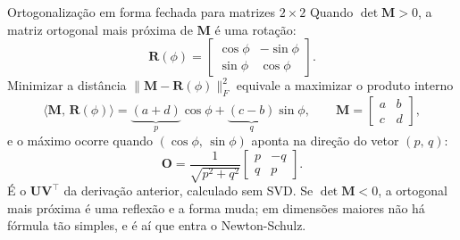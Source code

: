 \documentclass[aspectratio=169,xcolor=dvipsnames]{beamer}
\begin{document}
  \begin{frame}{Ortogonalização em forma fechada para matrizes $2\times 2$}
    Quando $\det \mathbf{M}>0$, a matriz ortogonal mais próxima de $\mathbf{M}$ é uma \alert{rotação}:
    \[
      \mathbf{R}(\phi)=\begin{bmatrix}\cos\phi&-\sin\phi\\ \sin\phi&\cos\phi\end{bmatrix}.
    \]
    Minimizar a distância $\|\mathbf{M}-\mathbf{R}(\phi)\|_{F}^{2}$ equivale a maximizar o produto interno
    \[
      \langle \mathbf{M},\,\mathbf{R}(\phi)\rangle
      =\underbrace{(a+d)}_{p}\cos\phi+\underbrace{(c-b)}_{q}\sin\phi,
      \qquad \mathbf{M}=\begin{bmatrix}a&b\\c&d\end{bmatrix},
    \]
    e o máximo ocorre quando $(\cos\phi,\,\sin\phi)$ aponta na direção do vetor $(p,\,q)$:
    \[
      \mathbf{O}=\frac{1}{\sqrt{p^{2}+q^{2}}}\begin{bmatrix}p&-q\\q&p\end{bmatrix}.
    \]
    {\footnotesize\color{gray!50!black}É o $\mathbf{U}\mathbf{V}^{\top}$ da derivação anterior, calculado sem SVD. Se $\det \mathbf{M}<0$, a ortogonal mais próxima é uma reflexão e a forma muda; em dimensões maiores não há fórmula tão simples, e é aí que entra o Newton-Schulz.}
  \end{frame}
\end{document}
